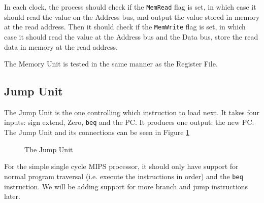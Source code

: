 In each clock, the process should check if the \texttt{MemRead} flag is set, in
which case it should read the value on the Address bus, and output the value
stored in memory at the read address. Then it should check if the
\texttt{MemWrite} flag is set, in which case it should read the value at the
Address bus and the Data bus, store the read data in memory at the read
address.

The Memory Unit is tested in the same manner as the Register File.

\subsection{Jump Unit}
The Jump Unit is the one controlling which instruction to load next. It takes
four inputs: sign extend, Zero, \texttt{beq} and the PC. It
produces one output: the new PC. The Jump Unit and its connections
can be seen in Figure \ref{fig:jump}
\begin{figure}
    \centering
    \caption{The Jump Unit}
    \label{fig:jump}
\end{figure}

For the simple single cycle MIPS processor, it should only have support for
normal program traversal (i.e. execute the instructions in order) and the
\texttt{beq} instruction. We will be adding support for more branch and jump
instructions later.

